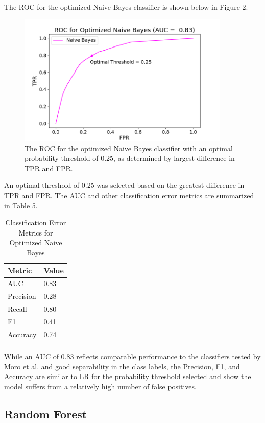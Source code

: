 \documentclass[11pt]{article}
\begin{document}
The ROC for the optimized Naive Bayes classifier is shown below in Figure 2.\\
\begin{figure}[H]
\centering
\includegraphics[width = 0.9\textwidth]{nb_roc.png} 
\caption{ The ROC for the optimized Naive Bayes classifier with an optimal probability threshold of 0.25, as determined by largest difference in TPR and FPR.}
\label{ROC}
\end{figure}

An optimal threshold of 0.25 was selected based on the greatest difference in TPR and FPR. The AUC and other classification error metrics are summarized in Table 5. 

\begin{table}[H]
\centering
\caption{Classification Error Metrics for Optimized Naive Bayes}
\begin{tabular}{ll}
\hline
\textbf{Metric }& \textbf{Value }\\
\hline
AUC &0.83  \\
Precision &0.28   \\
Recall &0.80  \\
F1 &0.41 \\
Accuracy &0.74 \\
\label{tB}
\end{tabular}
\end{table}

While an AUC of 0.83 reflects comparable performance to the classifiers tested by Moro et al. and good separability in the class labels, the Precision, F1, and Accuracy are similar to LR for the probability threshold selected and show the model suffers from a relatively high number of false positives.

\subsection{Random Forest}
\label{SS:4-3}
\end{document}
